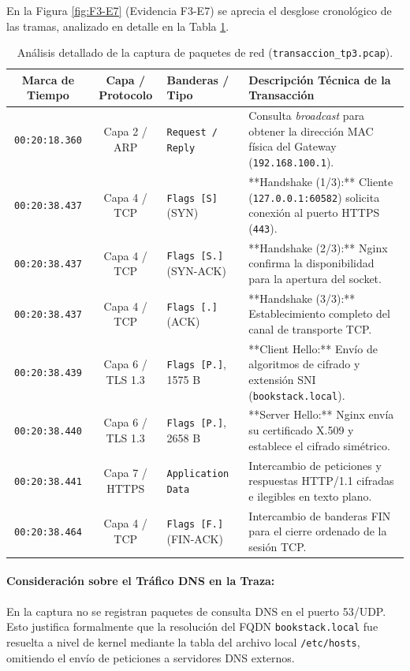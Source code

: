 \documentclass[12pt,a4paper]{article}
\begin{document}
En la Figura \ref{fig:F3-E7} (Evidencia F3-E7) se aprecia el desglose cronológico de las tramas, analizado en detalle en la Tabla \ref{tab:analisis_tcpdump}.

\begin{table}[h!]
\centering
\small
\begin{tabular}{|c|c|p{3.2cm}|p{5.8cm}|}
\hline
\textbf{Marca de Tiempo} & \textbf{Capa / Protocolo} & \textbf{Banderas / Tipo} & \textbf{Descripción Técnica de la Transacción} \\ \hline
\texttt{00:20:18.360} & Capa 2 / ARP & \texttt{Request / Reply} & Consulta \textit{broadcast} para obtener la dirección MAC física del Gateway (\texttt{192.168.100.1}). \\ \hline
\texttt{00:20:38.437} & Capa 4 / TCP & \texttt{Flags [S]} (SYN) & **Handshake (1/3):** Cliente (\texttt{127.0.0.1:60582}) solicita conexión al puerto HTTPS (\texttt{443}). \\ \hline
\texttt{00:20:38.437} & Capa 4 / TCP & \texttt{Flags [S.]} (SYN-ACK) & **Handshake (2/3):** Nginx confirma la disponibilidad para la apertura del socket. \\ \hline
\texttt{00:20:38.437} & Capa 4 / TCP & \texttt{Flags [.]} (ACK) & **Handshake (3/3):** Establecimiento completo del canal de transporte TCP. \\ \hline
\texttt{00:20:38.439} & Capa 6 / TLS 1.3 & \texttt{Flags [P.]}, 1575 B & **Client Hello:** Envío de algoritmos de cifrado y extensión SNI (\texttt{bookstack.local}). \\ \hline
\texttt{00:20:38.440} & Capa 6 / TLS 1.3 & \texttt{Flags [P.]}, 2658 B & **Server Hello:** Nginx envía su certificado X.509 y establece el cifrado simétrico. \\ \hline
\texttt{00:20:38.441} & Capa 7 / HTTPS & \texttt{Application Data} & Intercambio de peticiones y respuestas HTTP/1.1 cifradas e ilegibles en texto plano. \\ \hline
\texttt{00:20:38.464} & Capa 4 / TCP & \texttt{Flags [F.]} (FIN-ACK) & Intercambio de banderas FIN para el cierre ordenado de la sesión TCP. \\ \hline
\end{tabular}
\caption{Análisis detallado de la captura de paquetes de red (\texttt{transaccion\_tp3.pcap}).}
\label{tab:analisis_tcpdump}
\end{table}

\paragraph{Consideración sobre el Tráfico DNS en la Traza:}
En la captura no se registran paquetes de consulta DNS en el puerto 53/UDP. Esto justifica formalmente que la resolución del FQDN \texttt{bookstack.local} fue resuelta a nivel de kernel mediante la tabla del archivo local \texttt{/etc/hosts}, omitiendo el envío de peticiones a servidores DNS externos.
\end{document}
